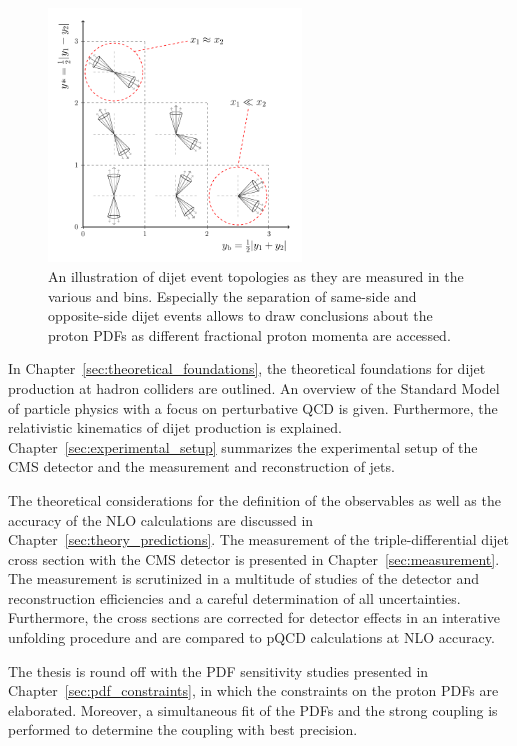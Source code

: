 \begin{figure}[htb]
    \centering
    \includegraphics[width=0.6\textwidth]{figures/drawings/ybys_hint.pdf}
    \caption[Illustration of dijet topologies various \ystar and \yboost bins.]{
             An illustration of dijet event topologies as they are measured in
             the various \ystar and \yboost bins. Especially the separation of
             same-side and opposite-side dijet events allows to draw conclusions about
             the proton PDFs as different fractional proton momenta are accessed.}
    \label{fig:intro_ybys_hint}
\end{figure}

In Chapter~\ref{sec:theoretical_foundations}, the theoretical foundations for
dijet production at hadron colliders are outlined. An overview of the Standard
Model of particle physics with a focus on perturbative QCD is given.
Furthermore, the relativistic kinematics of dijet production is explained.
Chapter~\ref{sec:experimental_setup} summarizes the experimental setup of the
CMS detector and the measurement and reconstruction of jets. 

The theoretical considerations for the definition of the observables as well as
the accuracy of the NLO calculations are discussed in
Chapter~\ref{sec:theory_predictions}. The measurement of the triple-differential
dijet cross section with the CMS detector is presented in
Chapter~\ref{sec:measurement}. The measurement is scrutinized in a multitude
of studies of the detector and reconstruction efficiencies and a careful
determination of all uncertainties. Furthermore, the cross sections are
corrected for detector effects in an interative unfolding procedure and are
compared to pQCD calculations at NLO accuracy.

The thesis is round off with the PDF sensitivity studies presented in
Chapter~\ref{sec:pdf_constraints}, in which the constraints on the proton PDFs
are elaborated. Moreover, a simultaneous fit of the PDFs and the strong coupling
is performed to determine the coupling with best precision.

